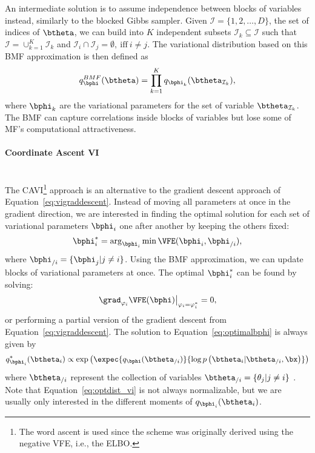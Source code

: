 An intermediate solution is to assume independence between blocks of variables instead, similarly to the blocked Gibbs sampler.
Given $\mathcal{I}=\{1,2,\ldots,D\}$, the set of indices of $\btheta$, we can build into $K$ independent subsets $\mathcal{I}_k \subseteq \mathcal{I}$ such that  $\mathcal{I} = \cup_{k=1}^K \mathcal{I}_{k}$ and $\mathcal{I}_i \cap \mathcal{I}_j=\emptyset,~\mathrm{iff}~i \neq j$.
The variational distribution based on this \ac{BMF} approximation is then defined as
\begin{align}
    q^{BMF}_{\bphi}(\btheta) = \prod_{k=1}^K q_{\bphi_k}(\btheta_{\mathcal{I}_k}),
\end{align}
where $\bphi_k$ are the variational parameters for the set of variable $\btheta_{\mathcal{I}_k}$.
The \ac{BMF} can capture correlations inside blocks of variables but lose some of \ac{MF}'s computational attractiveness.

\paragraph{Coordinate Ascent VI}\mbox{}\\
\label{sec:cavi}
The \ac{CAVI}\footnote{The word ascent is used since the scheme was originally derived using the negative \ac{VFE}, i.e., the \ac{ELBO}.} approach is an alternative to the gradient descent approach of Equation~\ref{eq:vigraddescent}.
Instead of moving all parameters at once in the gradient direction, we are interested in finding the optimal solution for each set of variational parameters $\bphi_i$ one after another by keeping the others fixed:
\begin{align}
    \bphi_i^* = \arg_{\bphi_i}\min \VFE(\bphi_i, \bphi_{/i}),
    \label{eq:optimalbphi}
\end{align}
where $\bphi_{/i} = \{\bphi_j | j \neq i\}$.
Using the \ac{BMF} approximation, we can update blocks of variational parameters at once.
The optimal $\bphi_i^*$ can be found by solving:
\begin{align}
\left.\grad_{\varphi_i}\VFE(\bphi)\right\vert_{\varphi_i=\varphi_i^*} = 0,
\end{align}
or performing a partial version of the gradient descent from Equation~\eqref{eq:vigraddescent}.
The solution to Equation~\eqref{eq:optimalbphi} is always given by
\begin{align}
q_{\bphi_i}^*(\btheta_i) \propto \exp\left(\expec{q_{\bphi}(\btheta_{/i})}{\log p\left(\btheta_i|\btheta_{/i},\bx\right)}\right)\label{eq:optdist_vi}
\end{align}
where $\btheta_{/i}$ represent the collection of variables $\btheta_{/i} = \{\theta_j | j \neq i\}$ \cite{murphyMachineLearningProbabilistic2012}.
Note that Equation~\ref{eq:optdist_vi} is not always normalizable, but we are usually only interested in the different moments of $q_{\bphi_i}(\btheta_i)$.

